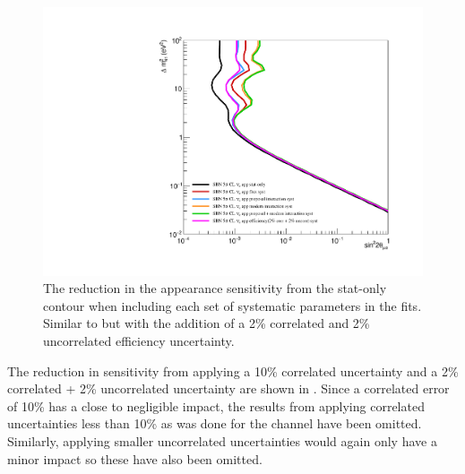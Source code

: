\begin{figure}[h!]
    \centering
    \includegraphics[width = \largefigwidth]{figures-chap6/exclusion_contours/nue_app_syst_groups+det.pdf}
    \caption[\nue app sensitivity reduction from different systematic groups with a (2+2)\% efficiency uncertainty.]{The reduction in the \nue appearance sensitivity from the stat-only contour when including each set of systematic parameters in the fits. Similar to  but with the addition of a 2\% correlated and 2\% uncorrelated efficiency uncertainty.}
    \label{fig:nue_app_syst_groups+efficiency}
\end{figure}

The reduction in sensitivity from applying a 10\% correlated uncertainty and a 2\% correlated + 2\% uncorrelated uncertainty are shown in . Since a correlated error of 10\% has a close to negligible impact, the results from applying correlated uncertainties less than 10\% as was done for the \numu channel have been omitted. Similarly, applying smaller uncorrelated uncertainties would again only have a minor impact so these have also been omitted.  

